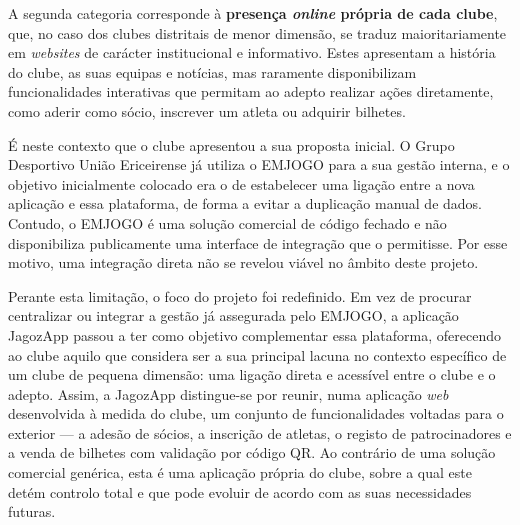 A segunda categoria corresponde à \textbf{presença \textit{online} própria de 
cada clube}, que, no caso dos clubes distritais de menor dimensão, se traduz 
maioritariamente em \textit{websites} de carácter institucional e informativo. 
Estes apresentam a história do clube, as suas equipas e notícias, mas raramente 
disponibilizam funcionalidades interativas que permitam ao adepto realizar 
ações diretamente, como aderir como sócio, inscrever um atleta ou adquirir 
bilhetes.

É neste contexto que o clube apresentou a sua proposta inicial. O Grupo 
Desportivo União Ericeirense já utiliza o EMJOGO para a sua gestão interna, e o 
objetivo inicialmente colocado era o de estabelecer uma ligação entre a nova 
aplicação e essa plataforma, de forma a evitar a duplicação manual de dados. 
Contudo, o EMJOGO é uma solução comercial de código fechado e não disponibiliza 
publicamente uma interface de integração que o permitisse. Por esse motivo, uma 
integração direta não se revelou viável no âmbito deste projeto.

Perante esta limitação, o foco do projeto foi redefinido. Em vez de procurar 
centralizar ou integrar a gestão já assegurada pelo EMJOGO, a aplicação 
JagozApp passou a ter como objetivo complementar essa plataforma, oferecendo ao 
clube aquilo que considera ser a sua principal lacuna no contexto específico de 
um clube de pequena dimensão: uma ligação direta e acessível entre o clube e o 
adepto. Assim, a JagozApp distingue-se por reunir, numa aplicação 
\textit{web} desenvolvida à medida do clube, um conjunto de funcionalidades 
voltadas para o exterior — a adesão de sócios, a inscrição de atletas, o registo 
de patrocinadores e a venda de bilhetes com validação por código QR. Ao 
contrário de uma solução comercial genérica, esta é uma aplicação própria do 
clube, sobre a qual este detém controlo total e que pode evoluir de acordo com 
as suas necessidades futuras.